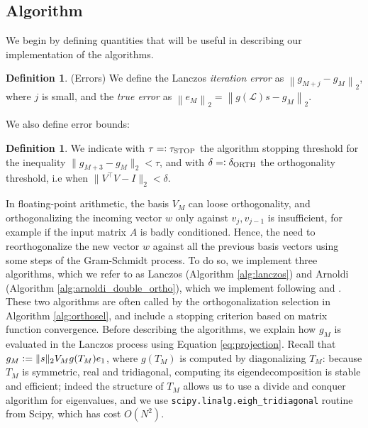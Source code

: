 \documentclass[11pt]{article}
\renewcommand{\L}{\mathcal{L}}
\newcommand{\defeq}{\vcentcolon=}
\newcommand{\eqdef}{=\vcentcolon}
\newcommand{\norm}[1]{\left\lVert#1\right\rVert}
\theoremstyle{definition}
\newtheorem{definition}[theorem]{Definition}
\theoremstyle{remark}
\theoremstyle{experimental}
\begin{document}
\subsection{Algorithm}
\label{ssec:algo}

We begin by defining quantities that will be useful in describing our implementation of the algorithms.

\begin{definition}(Errors)
  \label{def:errors}
  We define the Lanczos \emph{iteration error} as $\norm{g_{M+j} - g_M}_2 $, where $ j $ is small,
  and the \emph{true error} as $ \norm{e_M}_2 = \norm{g(\L)s - g_M}_2 $.
\end{definition}
We also define error bounds:
\begin{definition}
  We indicate with $ \tau \eqdef \tau_{\text{STOP}} $ the algorithm stopping threshold for the
  inequality
  $ \| g_{M+3} -g_M \|_2< \tau $, and with $ \delta \eqdef \delta_{\text{ORTH}} $ the orthogonality
  threshold, i.e when $ \| V^{\top} V - I \|_2 < \delta $.
\end{definition}



In floating-point arithmetic, the basis $ V_M $ can loose orthogonality, and orthogonalizing
the incoming vector $ w $ only against $ v_j,v_{j-1} $ is insufficient, for example if the input
matrix $ A $ is badly conditioned. Hence, the need to
reorthogonalize the new vector $ w $ against all the previous basis vectors using some steps of the
Gram-Schmidt process. To do so, we implement three algorithms, which we refer to as Lanczos 
(Algorithm \ref{alg:lanczos}) and Arnoldi (Algorithm \ref{alg:arnoldi_double_ortho}), which we
implement following \cite{demmel1997} and \cite{susnjara2015}. These two algorithms are often called
by the orthogonalization selection in Algorithm \ref{alg:orthosel}, and include a stopping criterion
based on matrix function convergence. Before describing the algorithms, we explain how $ g_M $ is
evaluated in the Lanczos process using Equation \ref{eq:projection}.
Recall that $  g_M \defeq \|s\|_2V_Mg(T_M)e_1
$, where $ g(T_M) $ is computed by diagonalizing $ T_M $: because $ T_M $ is symmetric, real and tridiagonal, 
computing its eigendecomposition is stable and efficient; indeed the structure of $ T_M $ allows us
to use a divide and conquer algorithm for eigenvalues, and we use \texttt{scipy.linalg.eigh\_tridiagonal}
routine from Scipy, which has cost $ O(N^2) $.
\end{document}

